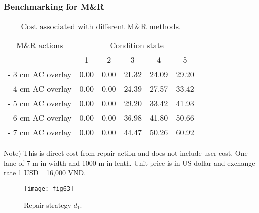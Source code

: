 \subsubsection{Benchmarking for M\&R}
\label{6422}
\begin{table}[t]
\caption{Cost associated with different M\&R methods.}
\label{table62}
\begin{center}
{\small
\begin{tabular}{l|lllll}
\hline
\multicolumn{1}{c|}{M\&R actions} & \multicolumn{5}{c}{Condition state} \\ 
 & \multicolumn{1}{c}{1} & \multicolumn{1}{c}{2} & \multicolumn{1}{c}{3} & \multicolumn{1}{c}{4} & \multicolumn{1}{c}{5} \\ 
\hline
- 3 cm AC overlay & \multicolumn{1}{r}{0.00 } & \multicolumn{1}{r}{0.00 } & \multicolumn{1}{r}{21.32 } & \multicolumn{1}{r}{24.09 } & \multicolumn{1}{r}{29.20 } \\ 
 - 4 cm AC overlay & \multicolumn{1}{r}{0.00 } & \multicolumn{1}{r}{0.00 } & \multicolumn{1}{r}{24.39 } & \multicolumn{1}{r}{27.57 } & \multicolumn{1}{r}{33.42 } \\ 
 - 5 cm AC overlay & \multicolumn{1}{r}{0.00 } & \multicolumn{1}{r}{0.00 } & \multicolumn{1}{r}{29.20 } & \multicolumn{1}{r}{33.42 } & \multicolumn{1}{r}{41.93 } \\ 
 - 6 cm AC overlay & \multicolumn{1}{r}{0.00 } & \multicolumn{1}{r}{0.00 } & \multicolumn{1}{r}{36.98 } & \multicolumn{1}{r}{41.80 } & \multicolumn{1}{r}{50.66 } \\ 
 - 7 cm AC overlay & 0.00  & 0.00  & 44.47  & 50.26  & 60.92  \\ 
\hline
\end{tabular}
}
\end{center}
\footnotesize Note) This is direct cost from repair action and does not include user-cost. One lane of 7 m in width and 1000 m in lenth. Unit price is in US dollar and exchange rate 1 USD =16,000 VND.
\end{table}
\begin{figure}[t]
\begin{center}
\texttt{[image: fig63]}
\end{center}
\caption{Repair strategy $d_1$.}
\label{fig63}
\end{figure}
